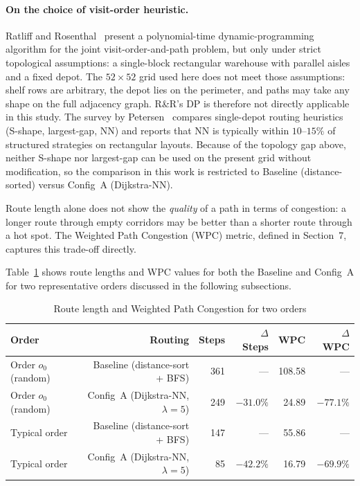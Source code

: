 \documentclass[12pt,a4paper]{article}
\begin{document}
\paragraph{On the choice of visit-order heuristic.}
Ratliff and Rosenthal~\cite{ref_ratliff} present a polynomial-time
dynamic-programming algorithm for the joint visit-order-and-path problem,
but only under strict topological assumptions: a single-block rectangular
warehouse with parallel aisles and a fixed depot.
The $52 \times 52$ grid used here does not meet those assumptions: shelf
rows are arbitrary, the depot lies on the perimeter, and paths may take
any shape on the full adjacency graph.
R\&R's DP is therefore not directly applicable in this study.
The survey by Petersen~\cite{ref_petersen} compares single-depot routing
heuristics (S-shape, largest-gap, NN) and reports that NN is typically
within $10$--$15\%$ of structured strategies on rectangular layouts.
Because of the topology gap above, neither S-shape nor largest-gap can be
used on the present grid without modification, so the comparison in this
work is restricted to Baseline (distance-sorted) versus Config~A
(Dijkstra-NN).

Route length alone does not show the \emph{quality} of a path in terms
of congestion: a longer route through empty corridors may be better than
a shorter route through a hot spot. The Weighted Path Congestion (WPC)
metric, defined in Section~7, captures this trade-off directly.

Table~\ref{tab:wpc} shows route lengths and WPC values for both the Baseline and
Config~A for two representative orders discussed in the following subsections.

\begin{table}[h]
\centering
\caption{Route length and Weighted Path Congestion for two orders}
\label{tab:wpc}
\begin{tabular}{lrrrrr}
\hline
\textbf{Order} & \textbf{Routing} & \textbf{Steps} & \textbf{$\Delta$Steps} & \textbf{WPC} & \textbf{$\Delta$WPC} \\
\hline
Order $o_0$ (random) & Baseline (distance-sort + BFS) & 361 & ---             & 108.58 & ---                    \\
Order $o_0$ (random) & Config~A (Dijkstra-NN, $\lambda=5$) & 249 & $-31.0\%$  & 24.89 & $-77.1\%$              \\
\hline
Typical order        & Baseline (distance-sort + BFS) & 147 & ---             & 55.86 & ---                    \\
Typical order        & Config~A (Dijkstra-NN, $\lambda=5$) & 85  & $-42.2\%$  & 16.79 & $-69.9\%$              \\
\hline
\end{tabular}
\end{table}
\end{document}
